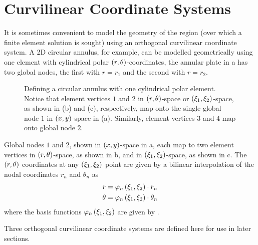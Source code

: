 \section{Curvilinear Coordinate Systems}
\label{sec:ccs-1.8}
It is sometimes convenient to model the geometry of the region (over which a 
finite element solution is sought) using an orthogonal curvilinear coordinate 
system. A 2D circular annulus, for example, can be modelled geometrically 
using one element with cylindrical polar $\left( r,\theta \right)$-coordinates, \eg 
the annular plate in a has two global nodes, the first with 
$r=r_{1}$ and the second with $r=r_{2}$.

\begin{figure}[htbp] \centering
 
  \caption{Defining a circular annulus with one cylindrical polar element. 
    Notice that element vertices $1$ and $2$ in $\left( r,\theta \right)$-space or
    $\left( \xi_{1},\xi_{2} \right)$-space, as shown in (b) and (c), respectively, map onto
    the single global node $1$ in $\left( x ,y \right)$-space in (a).  Similarly, element
    vertices $3$ and $4$ map onto global node $2$.}
  \label{fig:dca}
\end{figure}
 
Global nodes $1$ and $2$, shown in $\left( x,y \right)$-space in a, each 
map to two element vertices in $\left( r,\theta \right)$-space, as shown in
b, and in $\left( \xi_{1},\xi_{2} \right)$-space, as shown in
c. The $\left( r,\theta \right)$ coordinates at any
$\left( \xi_{1},\xi_{2} \right)$ point are given by a bilinear interpolation of the nodal
coordinates $r_{n}$ and $\theta_{n}$ as
\begin{align*}
  r &=    \varphi_{n} \left( \xi_{1},\xi_{2} \right)  \cdot r_{n}\\
  \theta &=    \varphi_{n} \left( \xi_{1},\xi_{2} \right)  \cdot\theta_{n} 
\end{align*}
where the basis functions $   \varphi_{n} \left( \xi_{1},\xi_{2} \right)  $ are given by .


Three orthogonal curvilinear coordinate systems are defined here for use in
later sections.

